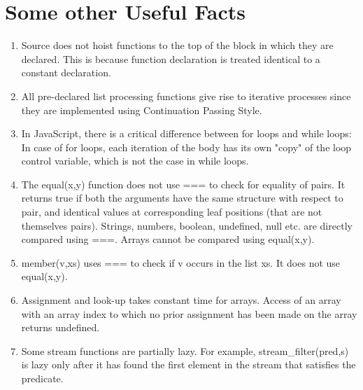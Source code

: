 \documentclass[11pt]{article}
\theoremstyle{definition}
\begin{document}
\begin{enumerate}
\end{enumerate}
\section{Some other Useful Facts}
\begin{enumerate}
    \item Source does not hoist functions to the top of the block in which they are declared. This is because function declaration is treated identical to a constant declaration.
    \item All pre-declared list processing functions give rise to iterative processes since they are implemented using Continuation Passing Style.
    \item In JavaScript, there is a critical difference between for loops and while loops: In case of for loops, each iteration of the body has its own "copy" of the loop control variable, which is not the case in while loops.
    \item The {\code equal(x,y)} function does not use === to check for equality of pairs. It returns true if both the arguments have the same structure with respect to pair, and identical values at corresponding leaf positions (that are not themselves pairs). Strings, numbers, boolean, undefined, null etc. are directly compared using ===. Arrays cannot be compared using {\code equal(x,y)}.
    \item {\code member(v,xs)} uses === to check if v occurs in the list xs. It does not use {\code equal(x,y)}.
    \item Assignment and look-up takes constant time for arrays. Access of an array with an array index to which no prior assignment has been made on the array
    returns {\code undefined}.
    \item Some stream functions are partially lazy. For example, {\code stream\_filter(pred,s) } is lazy only after it has found the first element in the stream that satisfies the predicate.
\end{enumerate}
\end{document}
